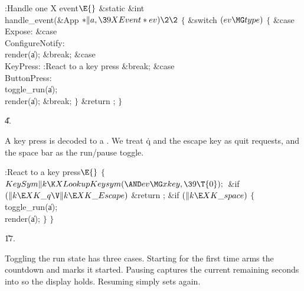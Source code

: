\Y\B\4:Handle one X event\X${}\E{}$\6
\1\1\&{static} \&{int} \\{handle\_event}(\&{App} ${}{*}\|a,\39\\{XEvent}*%
\\{ev})\2\2{}$\6
${}\{{}$\1\6
\&{switch} ${}(\\{ev}\MG\\{type}){}$\5
${}\{{}$\1\6
\4\&{case} \\{Expose}:\5
\&{case} \\{ConfigureNotify}:\5
\\{render}(\|a);\6
\&{break};\6
\4\&{case} \\{KeyPress}:\5
:React to a key press\X\6
\&{break};\6
\4\&{case} \\{ButtonPress}:\5
\\{toggle\_run}(\|a);\6
\\{render}(\|a);\6
\&{break};\6
\4${}\}{}$\2\6
\&{return} ;\6
\4${}\}{}$\2\par
\U4.\fi

A key press is decoded to a .  We treat \.{q} and the
escape key
as quit requests, and the space bar as the run/pause toggle.

\Y\B\4:React to a key press\X${}\E{}$\6
${}\{{}$\1\6
${}\\{KeySym}\|k\K\\{XLookupKeysym}({\AND}\\{ev}\MG\\{xkey},\39\T{0});{}$\6
\&{if} ${}(\|k\E\\{XK\_q}\V\|k\E\\{XK\_Escape}){}$\1\5
\&{return} ;\2\6
\&{if} ${}(\|k\E\\{XK\_space}){}$\5
${}\{{}$\1\6
\\{toggle\_run}(\|a);\6
\\{render}(\|a);\6
\4${}\}{}$\2\6
\4${}\}{}$\2\par
\U17.\fi

Toggling the run state has three cases.  Starting for the first time
arms the countdown and marks it started.  Pausing captures the current
remaining seconds into  so the display holds.  Resuming simply
sets  again.

